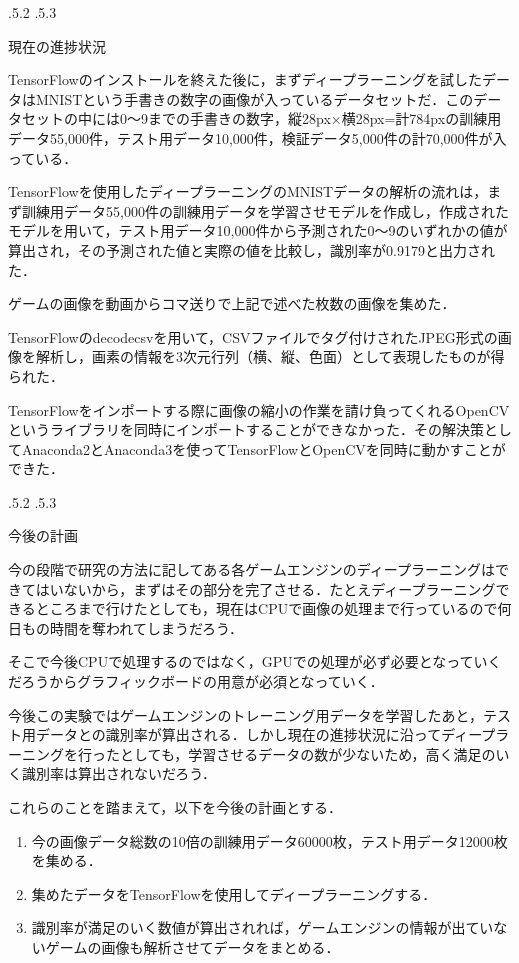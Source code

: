 \documentclass[uplatex]{jsarticle}
\makeatletter
\renewcommand{\section}{%
    \if@slide\clearpage\fi
    \@startsection{section}{1}{\z@}%
    {\Cvs \@plus.5\Cdp \@minus.2\Cdp}%
    {.5\Cvs \@plus.3\Cdp}%
    {\normalfont\raggedright}}
\makeatother
\begin{document}
\section{現在の進捗状況}

TensorFlowのインストールを終えた後に，まずディープラーニングを試したデータはMNISTという手書きの数字の画像が入っているデータセットだ．このデータセットの中には0～9までの手書きの数字，縦28px×横28px=計784pxの訓練用データ55,000件，テスト用データ10,000件，検証データ5,000件の計70,000件が入っている．

TensorFlowを使用したディープラーニングのMNISTデータの解析の流れは，まず訓練用データ55,000件の訓練用データを学習させモデルを作成し，作成されたモデルを用いて，テスト用データ10,000件から予測された0～9のいずれかの値が算出され，その予測された値と実際の値を比較し，識別率が0.9179と出力された．

ゲームの画像を動画からコマ送りで上記で述べた枚数の画像を集めた．

TensorFlowのdecodecsvを用いて，CSVファイルでタグ付けされたJPEG形式の画像を解析し，画素の情報を3次元行列（横、縦、色面）として表現したものが得られた．

TensorFlowをインポートする際に画像の縮小の作業を請け負ってくれるOpenCVというライブラリを同時にインポートすることができなかった．その解決策としてAnaconda2とAnaconda3を使ってTensorFlowとOpenCVを同時に動かすことができた．

\section{今後の計画}

今の段階で研究の方法に記してある各ゲームエンジンのディープラーニングはできてはいないから，まずはその部分を完了させる．たとえディープラーニングできるところまで行けたとしても，現在はCPUで画像の処理まで行っているので何日もの時間を奪われてしまうだろう．

そこで今後CPUで処理するのではなく，GPUでの処理が必ず必要となっていくだろうからグラフィックボードの用意が必須となっていく．

今後この実験ではゲームエンジンのトレーニング用データを学習したあと，テスト用データとの識別率が算出される．しかし現在の進捗状況に沿ってディープラーニングを行ったとしても，学習させるデータの数が少ないため，高く満足のいく識別率は算出されないだろう．

これらのことを踏まえて，以下を今後の計画とする．

\begin{enumerate}
\item 今の画像データ総数の10倍の訓練用データ60000枚，テスト用データ12000枚を集める．
\item 集めたデータをTensorFlowを使用してディープラーニングする．
\item 識別率が満足のいく数値が算出されれば，ゲームエンジンの情報が出ていないゲームの画像も解析させてデータをまとめる．
\end{enumerate}



\end{document}
